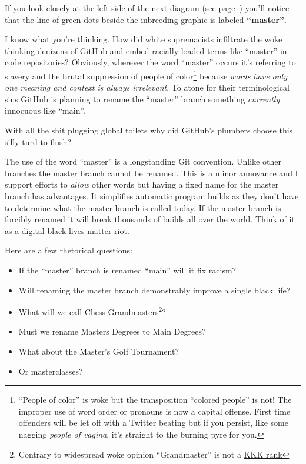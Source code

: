 If you look closely at the left side of the next diagram (see page~\pageref{fig:5835x0}) you'll
notice that the line of green dots beside the inbreeding graphic is
labeled \textbf{``master''}.

I know what you're thinking. How did white supremacists infiltrate the
woke thinking denizens of GitHub and embed racially loaded terms like
``master'' in code repositories? Obviously, wherever the word ``master''
occurs it's referring to slavery and the brutal suppression of people of
color\footnote{``People of color'' is woke but the transposition ``colored people''
  is not! The improper use of word order or pronouns is now a capital
  offense. First time offenders will be let off with a Twitter beating
  but if you persist, like some nagging \emph{people of vagina}, it's straight
  to the burning pyre for you.
} because \emph{words %
have only one meaning and context is always irrelevant}. To atone for
their terminological sins GitHub is planning to rename the ``master''
branch something \emph{currently} innocuous like ``main''.

With all the shit plugging global toilets why did GitHub's plumbers
choose this silly turd to flush?

The use of the word ``master'' is a longstanding Git convention. Unlike
other branches the master branch cannot be renamed. This is a minor
annoyance and I support efforts to \emph{allow} other words but having a
fixed name for the master branch has advantages. It simplifies automatic
program builds as they don't have to determine what the master branch is
called today. If the master branch is forcibly renamed it will break
thousands of builds all over the world. Think of it as a digital black
lives matter riot.

Here are a few rhetorical questions:

\begin{itemize}
\item
  If the ``master'' branch is renamed ``main'' will it fix racism?
\item
  Will renaming the master branch demonstrably improve a single black
  life?
\item
  What will we call Chess %
  Grandmasters\footnote{Contrary to widespread woke opinion ``Grandmaster'' is not a
  \href{https://en.wikipedia.org/wiki/Grand_Wizard}{KKK rank}}?
\item
  Must we rename Masters Degrees to Main Degrees?
\item
  What about the Master's Golf Tournament?
\item
  Or masterclasses?
\end{itemize}

